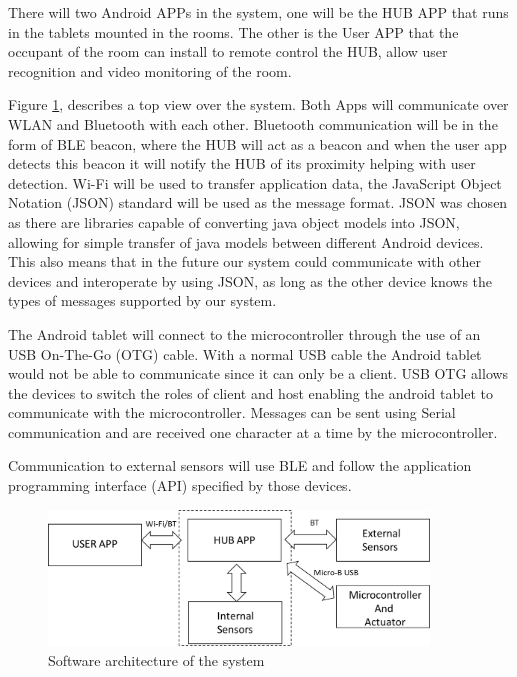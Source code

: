 There will two Android APPs in the system, one will be the HUB APP that runs in the tablets mounted in the rooms. The other is the User APP that the occupant of the room can install to remote control the HUB, allow user recognition and video monitoring of the room. 

Figure \ref{software1}, describes a top view over the system. Both Apps will communicate over WLAN and Bluetooth with each other. Bluetooth communication will be in the form of BLE beacon, where the HUB will act as a beacon and when the user app detects this beacon it will notify  the HUB of its proximity helping with user detection. Wi-Fi will be used to transfer application data, the JavaScript Object Notation (JSON) standard will be used as the message format. JSON was chosen as there are libraries capable of converting java object models into JSON, allowing for simple transfer of java models between different Android devices. This also means that in the future our system could communicate with other devices and interoperate by using JSON, as long as the other device knows the types of messages supported by our system.

The Android tablet will connect to the microcontroller through the use of an USB On-The-Go (OTG) cable. With a normal USB cable the Android tablet would not be able to communicate since it can only be a client. USB OTG allows the devices to switch the roles of client and host enabling the android tablet to communicate with the microcontroller. Messages can be sent using Serial communication and are received one character at a time by the microcontroller.

Communication to external sensors will use BLE and follow the application programming interface (API) specified by those devices.






\begin{figure}[h]
\centering
\includegraphics[width=0.9\textwidth]{Figures/software1}
\caption{Software architecture of the system}
\label{software1}
\end{figure}


